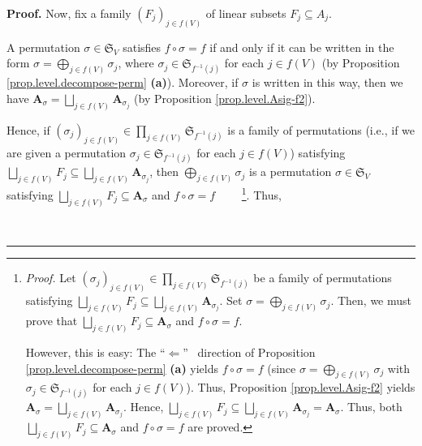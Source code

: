 \documentclass[numbers=enddot,12pt,final,onecolumn,notitlepage]{scrartcl}%
\numberwithin{exer}{section}
\theoremstyle{definition}
\newenvironment{proof}[1][Proof]{\noindent\textbf{#1.} }{\ \rule{0.5em}{0.5em}}
\let\prodnonlimits\prod
\let\sqcupnonlimits\bigsqcup
\let\oplusnonlimits\bigoplus
\renewcommand{\prod}{\prodnonlimits\limits}
\renewcommand{\bigsqcup}{\sqcupnonlimits\limits}
\renewcommand{\bigoplus}{\oplusnonlimits\limits}
\newenvironment{verlong}{}{}
\begin{document}
\begin{verlong}
\begin{proof}
Now, fix a family $\left(  F_{j}\right)  _{j\in f\left(  V\right)  }$ of
linear subsets $F_{j}\subseteq A_{j}$.

A permutation $\sigma\in\mathfrak{S}_{V}$ satisfies $f\circ\sigma=f$ if and
only if it can be written in the form $\sigma=\bigoplus_{j\in f\left(
V\right)  }\sigma_{j}$, where $\sigma_{j}\in\mathfrak{S}_{f^{-1}\left(
j\right)  }$ for each $j\in f\left(  V\right)  $ (by Proposition
\ref{prop.level.decompose-perm} \textbf{(a)}). Moreover, if $\sigma$ is
written in this way, then we have $\mathbf{A}_{\sigma}=\bigsqcup_{j\in
f\left(  V\right)  }\mathbf{A}_{\sigma_{j}}$ (by Proposition
\ref{prop.level.Asig-f2}).

Hence, if $\left(  \sigma_{j}\right)  _{j\in f\left(  V\right)  }\in
\prod_{j\in f\left(  V\right)  }\mathfrak{S}_{f^{-1}\left(  j\right)  }$ is a
family of permutations (i.e., if we are given a permutation $\sigma_{j}%
\in\mathfrak{S}_{f^{-1}\left(  j\right)  }$ for each $j\in f\left(  V\right)
$) satisfying $\bigsqcup_{j\in f\left(  V\right)  }F_{j}\subseteq
\bigsqcup_{j\in f\left(  V\right)  }\mathbf{A}_{\sigma_{j}}$, then
$\bigoplus_{j\in f\left(  V\right)  }\sigma_{j}$ is a permutation $\sigma
\in\mathfrak{S}_{V}$ satisfying $\bigsqcup_{j\in f\left(  V\right)  }%
F_{j}\subseteq\mathbf{A}_{\sigma}$ and $f\circ\sigma=f$%
\ \ \ \ \footnote{\textit{Proof.} Let $\left(  \sigma_{j}\right)  _{j\in
f\left(  V\right)  }\in\prod_{j\in f\left(  V\right)  }\mathfrak{S}%
_{f^{-1}\left(  j\right)  }$ be a family of permutations satisfying
$\bigsqcup_{j\in f\left(  V\right)  }F_{j}\subseteq\bigsqcup_{j\in f\left(
V\right)  }\mathbf{A}_{\sigma_{j}}$. Set $\sigma=\bigoplus_{j\in f\left(
V\right)  }\sigma_{j}$. Then, we must prove that $\bigsqcup_{j\in f\left(
V\right)  }F_{j}\subseteq\mathbf{A}_{\sigma}$ and $f\circ\sigma=f$.
\par
However, this is easy: The \textquotedblleft$\Longleftarrow$\textquotedblright%
\ direction of Proposition \ref{prop.level.decompose-perm} \textbf{(a)} yields
$f\circ\sigma=f$ (since $\sigma=\bigoplus_{j\in f\left(  V\right)  }\sigma
_{j}$ with $\sigma_{j}\in\mathfrak{S}_{f^{-1}\left(  j\right)  }$ for each
$j\in f\left(  V\right)  $). Thus, Proposition \ref{prop.level.Asig-f2} yields
$\mathbf{A}_{\sigma}=\bigsqcup_{j\in f\left(  V\right)  }\mathbf{A}%
_{\sigma_{j}}$. Hence, $\bigsqcup_{j\in f\left(  V\right)  }F_{j}%
\subseteq\bigsqcup_{j\in f\left(  V\right)  }\mathbf{A}_{\sigma_{j}%
}=\mathbf{A}_{\sigma}$. Thus, both $\bigsqcup_{j\in f\left(  V\right)  }%
F_{j}\subseteq\mathbf{A}_{\sigma}$ and $f\circ\sigma=f$ are proved.}. Thus,

\end{proof}
\end{verlong}
\end{document}

